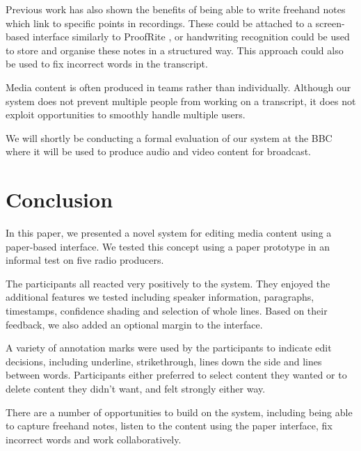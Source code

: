 Previous work has also shown the benefits of being able to write freehand notes
which link to specific points in recordings. These could be attached to a
screen-based interface similarly to ProofRite \cite{Conroy2004}, or handwriting
recognition could be used to store and organise these notes in a structured
way. This approach could also be used to fix incorrect words in the transcript.

Media content is often produced in teams rather than individually.  Although
our system does not prevent multiple people from working on a transcript, it
does not exploit opportunities to smoothly handle multiple users.

We will shortly be conducting a formal evaluation of our system at the BBC
where it will be used to produce audio and video content for broadcast. 


\section{Conclusion}
In this paper, we presented a novel system for editing media content using a
paper-based interface. We tested this concept using a paper prototype in an
informal test on five radio producers.

The participants all reacted very positively to the system. They enjoyed the
additional features we tested including speaker information, paragraphs,
timestamps, confidence shading and selection of whole lines. Based on their
feedback, we also added an optional margin to the interface.

A variety of annotation marks were used by the participants to indicate edit
decisions, including underline, strikethrough, lines down the side and lines
between words.  Participants either preferred to select content they wanted or
to delete content they didn't want, and felt strongly either way.

There are a number of opportunities to build on the system, including being
able to capture freehand notes, listen to the content using the paper
interface, fix incorrect words and work collaboratively.
